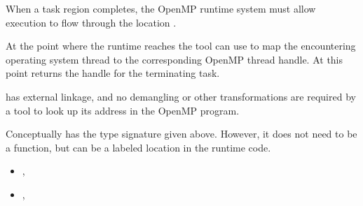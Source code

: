 \descr

When a task region completes, the OpenMP runtime system
must allow execution to flow through the location .

At the point where the runtime reaches 
the tool can use
to map the encountering operating system thread to the corresponding
OpenMP thread handle.
At this point 
returns the handle for the terminating task.

\restrictions

 has external  linkage, and no
demangling or other transformations are required by a tool
to look up its address in the OpenMP program.

Conceptually  has the type signature
given above.
However, it does not need to be a function, but can be a labeled location
in the runtime code.

\crossreferences
\begin{itemize}
\item
  , 
\item
  , 
\end{itemize}


